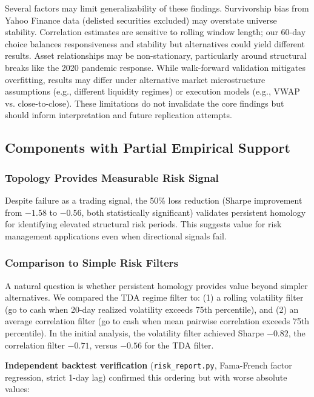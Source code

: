 Several factors may limit generalizability of these findings. Survivorship bias from Yahoo Finance data (delisted securities excluded) may overstate universe stability. Correlation estimates are sensitive to rolling window length; our 60-day choice balances responsiveness and stability but alternatives could yield different results. Asset relationships may be non-stationary, particularly around structural breaks like the 2020 pandemic response. While walk-forward validation mitigates overfitting, results may differ under alternative market microstructure assumptions (e.g., different liquidity regimes) or execution models (e.g., VWAP vs. close-to-close). These limitations do not invalidate the core findings but should inform interpretation and future replication attempts.

\subsection{Components with Partial Empirical Support}

\subsubsection{Topology Provides Measurable Risk Signal}

Despite failure as a trading signal, the 50\% loss reduction (Sharpe improvement from $-1.58$ to $-0.56$, both statistically significant) validates persistent homology for identifying elevated structural risk periods. This suggests value for risk management applications even when directional signals fail.

\subsubsection{Comparison to Simple Risk Filters}

A natural question is whether persistent homology provides value beyond simpler alternatives. We compared the TDA regime filter to: (1) a rolling volatility filter (go to cash when 20-day realized volatility exceeds 75th percentile), and (2) an average correlation filter (go to cash when mean pairwise correlation exceeds 75th percentile). In the initial analysis, the volatility filter achieved Sharpe $-0.82$, the correlation filter $-0.71$, versus $-0.56$ for the TDA filter.

\textbf{Independent backtest verification} (\texttt{risk\_report.py}, Fama-French factor regression, strict 1-day lag) confirmed this ordering but with worse absolute values:

